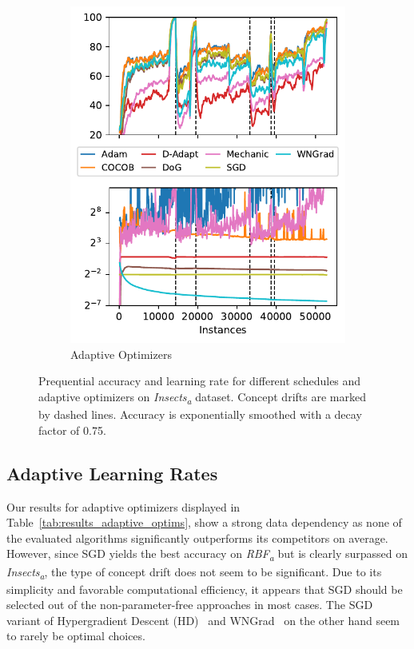 \documentclass{article} %
\begin{document}
\begin{figure}[ht]
\begin{subfigure}[b]{0.99\textwidth - \asize}
      \includegraphics[width=\textwidth]{figures/lr_norms_optims_insects_abrupt.pdf}
      \caption{Adaptive Optimizers}
      \label{fig:prequential_optims_insects}
   \end{subfigure}
   \caption{Prequential accuracy and learning rate for different schedules and adaptive optimizers on \textit{Insects\textsubscript{a}} dataset. Concept drifts are marked by dashed lines. Accuracy is exponentially smoothed with a decay factor of 0.75.}
\end{figure}

\subsection{Adaptive Learning Rates}

Our results for adaptive optimizers displayed in Table~\ref{tab:results_adaptive_optims}, show a strong data dependency as none of the evaluated algorithms significantly outperforms its competitors on average.
However, since SGD yields the best accuracy on \textit{RBF\textsubscript{a}} but is clearly surpassed on \textit{Insects\textsubscript{a}}, the type of concept drift does not seem to be significant.
Due to its simplicity and favorable computational efficiency, it appears that SGD should be selected out of the non-parameter-free approaches in most cases.
The SGD variant of Hypergradient Descent (HD)~\citep{baydinOnlineLearningRate2018} and WNGrad~\citep{wuWNGradLearnLearning2020} on the other hand seem to rarely be optimal choices.
\end{document}
